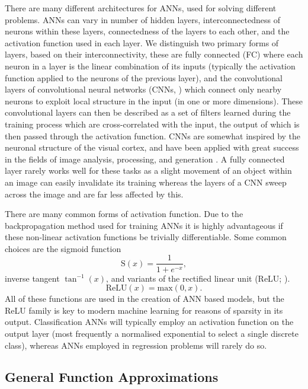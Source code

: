 There are many different architectures for ANNs, used for solving different problems.
ANNs can vary in number of hidden layers, interconnectedness of neurons within these layers, connectedness of the layers to each other, and the activation function used in each layer.
We distinguish two primary forms of layers, based on their interconnectivity, these are fully connected (FC) where each neuron in a layer is the linear combination of its inputs (typically the activation function applied to the neurons of the previous layer), and the convolutional layers of convolutional neural networks (CNNs, \citet{1998Lecun,2003Simard}) which connect only nearby neurons to exploit local structure in the input (in one or more dimensions).
These convolutional layers can then be described as a set of filters learned during the training process which are cross-correlated with the input, the output of which is then passed through the activation function.
CNNs are somewhat inspired by the neuronal structure of the visual cortex, and have been applied with great success in the fields of image analysis, processing, and generation \citep{Raschka2015}.
A fully connected layer rarely works well for these tasks as a slight movement of an object within an image can easily invalidate its training whereas the layers of a CNN sweep across the image and are far less affected by this.

There are many common forms of activation function.
Due to the backpropagation method used for training ANNs it is highly advantageous if these non-linear activation functions be trivially differentiable.
Some common choices are the sigmoid function
\begin{equation}
    \mathrm{S}(x) = \frac{1}{1+e^{-x}},
\end{equation}
inverse tangent $\tan^{-1}(x)$, and variants of the rectified linear unit (ReLU; \citet{2010Nair}).
\begin{equation}
    \mathrm{ReLU}(x) = \mathrm{max}(0, x).
\end{equation}
All of these functions are used in the creation of ANN based models, but the ReLU family is key to modern machine learning for reasons of sparsity in its output.
Classification ANNs will typically employ an activation function on the output layer (most frequently a normalised exponential to select a single discrete class), whereas ANNs employed in regression problems will rarely do so.

\subsection{General Function Approximations}

